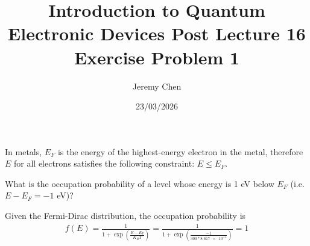 \documentclass[10pt,letterpaper]{article}
\title{Introduction to Quantum Electronic Devices Post Lecture 16 Exercise Problem 1}
\author{Jeremy Chen}
\date{23/03/2026}
\begin{document}
	\maketitle

\noindent In metals, $E_{F}$ is the energy of the highest-energy electron in the metal, therefore $E$ for all electrons satisfies the following constraint: $E \leq E_{F}$.

\noindent What is the occupation probability of a level whose energy is 1 eV below $E_{F}$ (i.e. $E - E_{F} = -1$ eV)?

\color{violet}
Given the Fermi-Dirac distribution, the occupation probability is
\begin{gather*}
f(E) = \frac{1}{1 + \exp{\left( \frac{E - E_{F}}{K_{B}T} \right )}} = \frac{1}{1 + \exp{\left( \frac{-1}{300 * \num{8.617e-5}} \right)}} = 1
\end{gather*}
\color{black}
\end{document}
